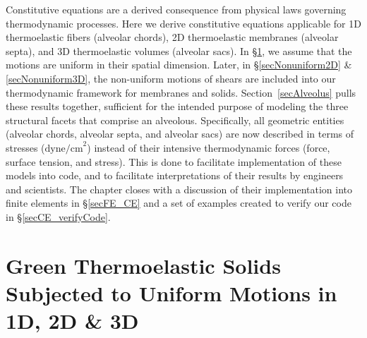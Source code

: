 Constitutive equations are a derived consequence from physical laws governing thermo\-dynamic processes.  Here we derive constitutive equations applicable for 1D thermo\-elastic fibers (alveolar chords), 2D thermo\-elastic membranes (alveolar septa), and 3D thermo\-elastic volumes (alveolar sacs).  In \S\ref{secUniformCE}, we assume that the motions are uniform in their spatial dimension.  Later, in \S\ref{secNonuniform2D} \& \ref{secNonuniform3D}, the non-uniform motions of shears are included into our thermo\-dynamic framework for membranes and solids.  Section~\ref{secAlveolus} pulls these results together, sufficient for the intended purpose of modeling the three structural facets that comprise an alveolous.  Specifically, all geometric entities (alveolar chords, alveolar septa, and alveolar sacs) are now described in terms of stresses ($\text{dyne/cm}^2$) instead of their intensive thermo\-dynamic forces (force, surface tension, and stress).  This is done to facilitate implementation of these models into code, and to facilitate interpretations of their results by engineers and scientists.  The chapter closes with a discussion of their implementation into finite elements in \S\ref{secFE_CE} and a set of examples created to verify our code in \S\ref{secCE_verifyCode}.

\section{Green Thermoelastic Solids Subjected to Uniform Motions in 1D, 2D \& 3D}
\label{secUniformCE}

